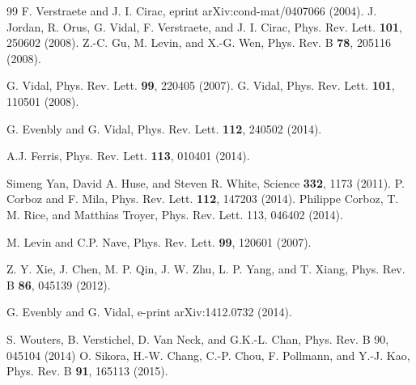 \documentclass[aps,prl,nopacs,twocolumn]{revtex4}
\begin{document}
\begin{thebibliography}{99}
F. Verstraete and J. I. Cirac, eprint arXiv:cond-mat/0407066 (2004).
J. Jordan, R. Orus, G. Vidal, F. Verstraete, and J. I. Cirac, Phys. Rev. Lett. {\bf 101}, 250602 (2008).
Z.-C. Gu, M. Levin, and X.-G. Wen, Phys. Rev. B {\bf 78}, 205116 (2008).

G. Vidal, Phys. Rev. Lett. {\bf 99}, 220405 (2007).
G. Vidal, Phys. Rev. Lett. {\bf 101}, 110501 (2008).

G. Evenbly and G. Vidal, %
Phys. Rev. Lett. {\bf 112}, 240502 (2014).

A.J. Ferris, %
Phys. Rev. Lett. {\bf 113}, 010401 (2014).

Simeng Yan, David A. Huse, and Steven R. White, %
Science {\bf 332}, 1173 (2011).
P. Corboz and F. Mila, %
Phys. Rev. Lett. {\bf 112}, 147203 (2014).
Philippe Corboz, T. M. Rice, and Matthias Troyer, %
Phys. Rev. Lett. 113, 046402 (2014).

M. Levin and C.P. Nave, %
Phys. Rev. Lett. {\bf 99}, 120601 (2007).

Z. Y. Xie, J. Chen, M. P. Qin, J. W. Zhu, L. P. Yang, and T. Xiang, %
Phys. Rev. B {\bf 86}, 045139 (2012).

G. Evenbly and G. Vidal, %
e-print arXiv:1412.0732 (2014).

S. Wouters, B. Verstichel, D. Van Neck, and G.K.-L. Chan, %
Phys. Rev. B 90, 045104 (2014)
O. Sikora, H.-W. Chang, C.-P. Chou, F. Pollmann, and Y.-J. Kao, %
Phys. Rev. B {\bf 91}, 165113 (2015).


\end{thebibliography}
\end{document}
